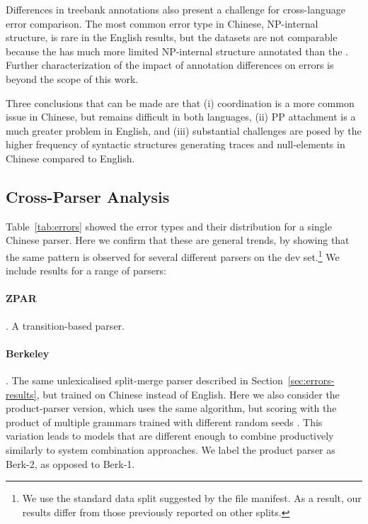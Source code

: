 Differences in treebank annotations also present a challenge for cross-language error comparison.
The most common error type in Chinese, NP-internal structure, is rare in the English results, but the datasets are not comparable because the \ptb has much more limited NP-internal structure annotated than the \pctb.
Further characterization of the impact of annotation differences on errors is beyond the scope of this work.

Three conclusions that can be made are that (i) coordination is a more common issue in Chinese, but remains difficult in
both languages, (ii) PP attachment is a much greater problem in English, and
(iii) substantial challenges are posed by the higher frequency of
syntactic structures generating traces and null-elements in Chinese compared to English.

\subsection{Cross-Parser Analysis} \label{sec:cross_parser_analysis}

Table~\ref{tab:errors} showed the error types and their distribution for a single Chinese parser.
Here we confirm that these are general trends, by showing that the same pattern
is observed for several different parsers on the  dev set.\footnote{
  We use the standard data split suggested by the  file manifest.
  As a result, our results differ from those previously reported on other splits.
}
We include results for a range of parsers:

\paragraph{ZPAR} \parencite{Zhang-Clark:2009:ICPT}.
A transition-based parser.

\paragraph{Berkeley} \parencite{Petrov-etal:2006,Petrov-Klein:2007}.
The same unlexicalised split-merge parser described in Section~\ref{sec:errors-results}, but trained on Chinese instead of English.
Here we also consider the product-parser version, which uses the same algorithm, but scoring with the product of multiple grammars trained with different random seeds \parencite{Petrov:2010:NAACLHLT}.
This variation leads to models that are different enough to combine productively similarly to system combination approaches.
We label the product parser as Berk-2, as opposed to Berk-1.

